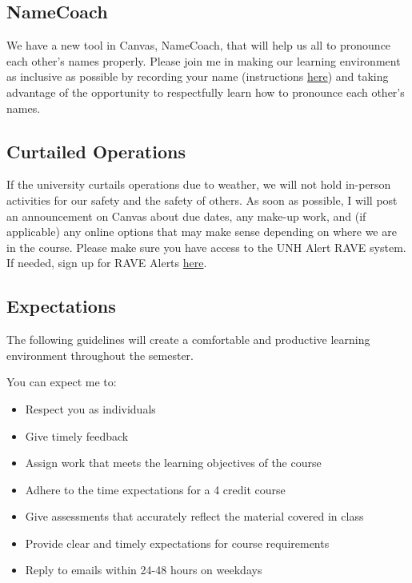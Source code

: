 \documentclass[
  letterpaper,
  DIV=11,
  numbers=noendperiod]{scrreprt}
\providecommand{\tightlist}{%
  \setlength{\itemsep}{0pt}\setlength{\parskip}{0pt}}\usepackage{longtable,booktabs,array}
\begin{document}
\hypertarget{namecoach}{%
\subsection*{NameCoach}\label{namecoach}}

We have a new tool in Canvas, NameCoach, that will help us all to
pronounce each other's names properly. Please join me in making our
learning environment as inclusive as possible by recording your name
(instructions
\href{https://td.unh.edu/TDClient/60/Portal/KB/ArticleDet?ID=4648}{here})
and taking advantage of the opportunity to respectfully learn how to
pronounce each other's names.

\hypertarget{curtailed-operations}{%
\subsection*{Curtailed Operations}\label{curtailed-operations}}

If the university curtails operations due to weather, we will not hold
in-person activities for our safety and the safety of others. As soon as
possible, I will post an announcement on Canvas about due dates, any
make-up work, and (if applicable) any online options that may make sense
depending on where we are in the course. Please make sure you have
access to the UNH Alert RAVE system. If needed, sign up for RAVE Alerts
\href{https://www.getrave.com/login/unh}{here}.

\hypertarget{expectations}{%
\subsection*{Expectations}\label{expectations}}

The following guidelines will create a comfortable and productive
learning environment throughout the semester.

You can expect me to:

\begin{itemize}
\tightlist
\item
  Respect you as individuals
\item
  Give timely feedback
\item
  Assign work that meets the learning objectives of the course
\item
  Adhere to the time expectations for a 4 credit course
\item
  Give assessments that accurately reflect the material covered in class
\item
  Provide clear and timely expectations for course requirements
\item
  Reply to emails within 24-48 hours on weekdays
\end{itemize}
\end{document}
